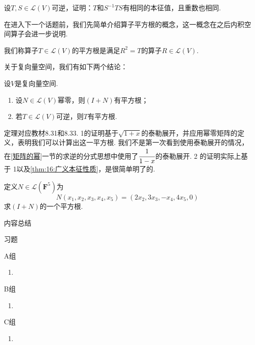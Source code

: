 \begin{example}
    设$T,S\in \mathcal{L}(V)$可逆，证明：$T$和$S^{-1}TS$有相同的本征值，且重数也相同.
\end{example}
在进入下一个话题前，我们先简单介绍算子平方根的概念，这一概念在之后内积空间算子会进一步说明.
\begin{definition}
    我们称算子$T\in \mathcal{L}(V)$的平方根是满足$R^2=T$的算子$R\in \mathcal{L}(V)$.
\end{definition}
关于复向量空间，我们有如下两个结论：
\begin{theorem} \label{thm:16:幂零平方根}
    设$V$是复向量空间.
    \begin{enumerate}
        \item 设$N\in \mathcal{L}(V)$幂零，则$(I+N)$有平方根；

        \item 若$T\in \mathcal{L}(V)$可逆，则$T$有平方根.
    \end{enumerate}
\end{theorem}
定理对应教材8.31和8.33. 1的证明基于$\sqrt{1+x}$的泰勒展开，并应用幂零矩阵的定义，表明我们可以计算出这一平方根.
我们不是第一次看到使用泰勒展开的情况，在\ref{矩阵的幂}一节的求逆的分式思想中使用了$\cfrac{1}{1-x}$的泰勒展开.
2 的证明实际上基于 1以及\autoref{thm:16:广义本征性质}，是很简单明了的.
\begin{example}
    定义$N\in \mathcal{L}(\mathbf{F}^5)$为
    \[N(x_1,x_2,x_3,x_4,x_5)=(2x_2,3x_3,-x_4,4x_5,0)\]
    求$(I+N)$的一个平方根.
\end{example}

\vspace{2ex}
\centerline{\heiti \Large 内容总结}

\vspace{2ex}

\centerline{\heiti \Large 习题}
\vspace{2ex}
{\kaishu }
\begin{flushright}
    \kaishu

\end{flushright}
\centerline{\heiti A组}
\begin{enumerate}
    \item
\end{enumerate}
\centerline{\heiti B组}
\begin{enumerate}
    \item
\end{enumerate}
\centerline{\heiti C组}
\begin{enumerate}
    \item
\end{enumerate}
